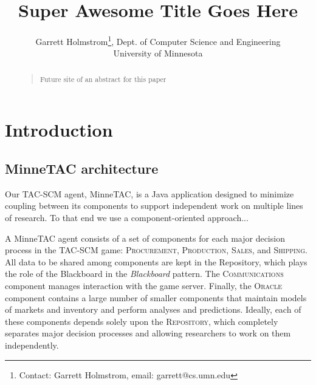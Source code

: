 \documentclass{article}
\begin{document}
\title{Super Awesome Title Goes Here}

\author{Garrett Holmstrom\thanks{Contact: Garrett Holmstrom, email: garrett@cs.umn.edu},
    Dept. of Computer Science and Engineering \\ University of Minnesota
}

\date{}

\maketitle

\begin{abstract}
\begin{quote}
Future site of an abstract for this paper
\end{quote}
\end{abstract}

\section{Introduction}


\subsection{MinneTAC architecture}

Our TAC-SCM agent, MinneTAC, is a Java application designed to minimize
coupling between its components to support independent work on multiple
lines of research.  To that end we use a component-oriented approach...

A MinneTAC agent consists of a set of components for each major decision
process in the TAC-SCM game: \textsc{Procurement}, \textsc{Production},
\textsc{Sales}, and \textsc{Shipping}.  All data to be shared
among components are kept in the Repository, which plays the role
of the Blackboard in the \emph{Blackboard} pattern\cite{Busch96}.
The \textsc{Communications} component manages interaction with the game
server.  Finally, the \textsc{Oracle} component contains a large number
of smaller components that maintain models of markets and inventory and
perform analyses and predictions.  Ideally, each of these components
depends solely upon the \textsc{Repository}, which completely separates
major decision processes and allowing researchers to work on them
independently.
\end{document}

